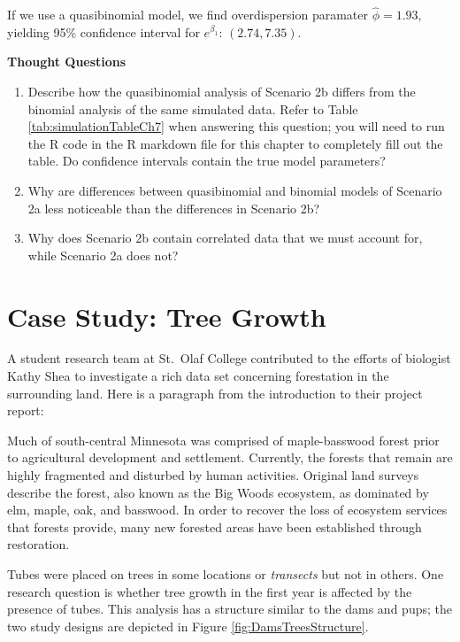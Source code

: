 \documentclass[
]{krantz}
\renewenvironment{quote}{\begin{VF}}{\end{VF}}
\begin{document}
If we use a quasibinomial model, we find overdispersion paramater \(\widehat{\phi} = 1.93\), yielding 95\% confidence interval for \(e^{\beta_1}\): \((2.74, 7.35)\).

\vspace{5mm}

\textbf{Thought Questions}

\begin{enumerate}
\def\labelenumi{\arabic{enumi}.}
\setcounter{enumi}{8}
\item
  Describe how the quasibinomial analysis of Scenario 2b differs from the binomial analysis of the same simulated data. Refer to Table \ref{tab:simulationTableCh7} when answering this question; you will need to run the R code in the R markdown file for this chapter to completely fill out the table. Do confidence intervals contain the true model parameters?
\item
  Why are differences between quasibinomial and binomial models of Scenario 2a less noticeable than the differences in Scenario 2b?
\item
  Why does Scenario 2b contain correlated data that we must account for, while Scenario 2a does not?
\end{enumerate}

\hypertarget{case-study-tree-growth}{%
\section{Case Study: Tree Growth}\label{case-study-tree-growth}}

A student research team at St.~Olaf College contributed to the efforts of biologist Kathy Shea to investigate a rich data set concerning forestation in the surrounding land. \citep{Eisinger2011} Here is a paragraph from the introduction to their project report:

\begin{quote}
Much of south-central Minnesota was comprised of maple-basswood forest prior to agricultural development and settlement. Currently, the forests that remain are highly fragmented and disturbed by human activities. Original land surveys describe the forest, also known as the Big Woods ecosystem, as dominated by elm, maple, oak, and basswood. In order to recover the loss of ecosystem services that forests provide, many new forested areas have been established through restoration.
\end{quote}

Tubes were placed on trees in some locations or \emph{transects} but not in others. One research question is whether tree growth in the first year is affected by the presence of tubes. This analysis has a structure similar to the dams and pups; the two study designs are depicted in Figure \ref{fig:DamsTreesStructure}.
\end{document}
